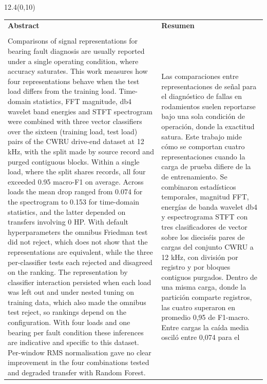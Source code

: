\documentclass[12pt,twoside,titlepage]{ingenius}
\begin{document}
\begin{textblock}{12.4}(0,10)
\adscripcion
\end{textblock}
\begin{table}[htb]
\begin{tabular}{p{8cm}p{8cm}}
{\Large \bfseries Abstract} &{\Large \bfseries Resumen} \\ \\
Comparisons of signal representations for bearing fault diagnosis are usually
reported under a single operating condition, where accuracy saturates. This
work measures how four representations behave when the test load differs from
the training load. Time-domain statistics, FFT magnitude, db4 wavelet band
energies and STFT spectrogram were combined with three vector classifiers over
the sixteen (training load, test load) pairs of the CWRU drive-end dataset at
12 kHz, with the split made by source record and purged contiguous blocks.
Within a single load, where the split shares records, all four exceeded 0.95 macro-F1 on average. Across loads the mean drop ranged from 0.074 for the spectrogram to
0.153 for time-domain statistics, and the latter depended on transfers involving 0 HP. With default hyperparameters the
omnibus Friedman test did not reject, which does not show that the
representations are equivalent, while the three per-classifier tests each
rejected and disagreed on the ranking. The representation by classifier
interaction persisted when each load was left out and under nested tuning on
training data, which also made the omnibus test reject, so rankings depend on
the configuration. With four loads and one bearing per fault condition these
inferences are indicative and specific to this dataset. Per-window RMS normalisation gave no clear improvement in the four combinations
tested and degraded transfer with Random Forest.
&
Las comparaciones entre representaciones de señal para el diagnóstico de fallas
en rodamientos suelen reportarse bajo una sola condición de operación, donde la
exactitud satura. Este trabajo mide cómo se comportan cuatro
representaciones cuando la carga de prueba difiere de la de entrenamiento. Se
combinaron estadísticos temporales, magnitud FFT, energías de banda wavelet db4
y espectrograma STFT con tres clasificadores de vector sobre los dieciséis pares de cargas del conjunto CWRU a 12 kHz, con
división por registro y por bloques contiguos purgados. Dentro de una
misma carga, donde la partición comparte registros, las cuatro superaron en promedio 0,95 de
F1-macro. Entre cargas la caída media osciló entre 0,074 para el

\end{tabular}
\end{table}
\end{document}
